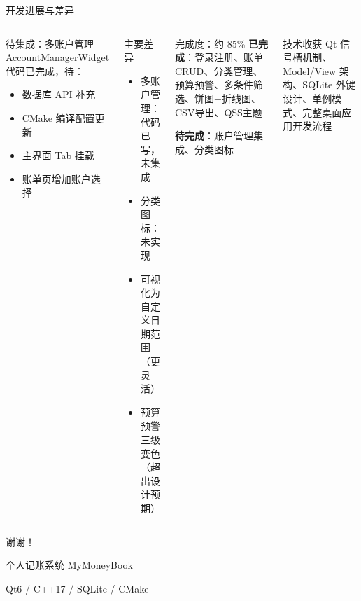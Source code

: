 \documentclass[12pt,aspectratio=169,UTF8]{ctexbeamer}
\begin{document}
\begin{frame}{开发进展与差异}
  \begin{columns}[t]
    \begin{alertblock}{待集成：多账户管理}
      AccountManagerWidget 代码已完成，待：
      \begin{itemize}
        \item 数据库 API 补充
        \item CMake 编译配置更新
        \item 主界面 Tab 挂载
        \item 账单页增加账户选择
      \end{itemize}
    \end{alertblock}

    \begin{block}{主要差异}
      \begin{itemize}
        \item 多账户管理：代码已写，未集成
        \item 分类图标：未实现
        \item 可视化为自定义日期范围（更灵活）
        \item 预算预警三级变色（超出设计预期）
      \end{itemize}
    \end{block}

    \begin{exampleblock}{完成度：约 85\%}
      \textbf{已完成}：登录注册、账单 CRUD、分类管理、预算预警、多条件筛选、饼图+折线图、CSV导出、QSS主题

      \vspace{6pt}
      \textbf{待完成}：账户管理集成、分类图标
    \end{exampleblock}

    \vspace{6pt}
    \begin{block}{技术收获}
      Qt 信号槽机制、Model/View 架构、SQLite 外键设计、单例模式、完整桌面应用开发流程
    \end{block}
  \end{columns}
\end{frame}

\begin{frame}
  \begin{center}
    \Huge
    {\color{primary}谢谢！}

    \vspace{24pt}
    \normalsize
    个人记账系统 \quad MyMoneyBook

    \vspace{8pt}
    \small
    Qt6 \;/\; C++17 \;/\; SQLite \;/\; CMake
  \end{center}
\end{frame}
\end{document}
